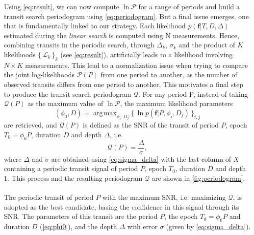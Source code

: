 \documentclass{aastex631}
\newcommand{\set}[1]{\{\,#1\,\}}
\DeclareMathOperator*{\argmax}{arg\,max}
\begin{document}
Using \autoref{eq:result}, we can now compute $\ln\mathcal{P}$ for a range of periods and build a transit search periodogram using \autoref{eq:periodogram}. But a final issue emerges, one that is fundamentally linked to our strategy. Each likelihood $p(\bm{f} \vert T, D, \Delta)$ estimated during the \textit{linear search} is computed using N measurements. Hence, combining transits in the periodic search, through $\Delta_k$, $\sigma_k$ and the product of $K$ likelihoods $\set{\mathcal{L}_k}_k$ (see \autoref{eq:result}), artificially leads to a likelihood involving $N\times K$ measurements. This lead to a normalization issue when trying to compare the joint log-likelihoods $\mathcal{P}(P)$ from one period to another, as the number of observed transits differs from one period to another. This motivates a final step to produce the transit search periodogram $\mathcal{Q}$. For any period P, instead of taking $ \mathcal{Q}(P)$ as the maximum value of $\ln\mathcal{P}$, the maximum likelihood parameters
\begin{equation}\label{eq:phi0}
    (\phi_0 ,D) = \argmax_{\phi_i, D_j} \set{\ln p(\bm{f} \vert P, \phi_i, D_j)}_{i, j}
\end{equation}
are retrieved, and $\mathcal{Q}(P)$ is defined as the SNR of the transit of period $P$, epoch $T_0 = \phi_0 P$, duration $D$ and depth $\Delta$, i.e.
\begin{equation*}
    \mathcal{Q}(P) = \frac{\Delta}{\sigma},
\end{equation*}
where $\Delta$ and $\sigma$ are obtained using \autoref{eq:sigma_delta} with the last column of $X$ containing a periodic transit signal of period $P$, epoch $T_0$, duration $D$ and depth $1$. This process and the resulting periodogram $\mathcal{Q}$ are shown in \autoref{fig:periodogram}.\\\\
The periodic transit of period $P$ with the maximum SNR, i.e. maximizing $\mathcal{Q}$, is adopted as the best candidate, basing the confidence in this signal through its SNR. The parameters of this transit are the period $P$, the epoch $T_0 = \phi_0 P$ and duration $D$ (\autoref{eq:phi0}), and the depth $\Delta$ with error $\sigma$ (given by \autoref{eq:sigma_delta}).
\end{document}
